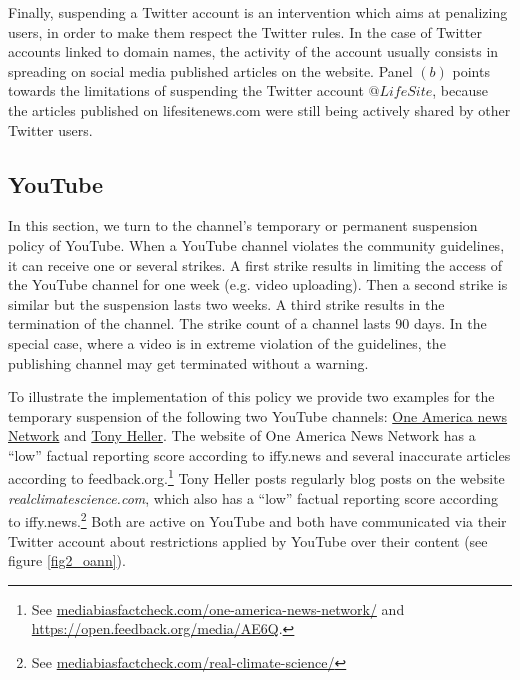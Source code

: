 \documentclass{article}
\begin{document}
Finally, suspending a Twitter account is an intervention which aims at penalizing users, in order to make them respect the Twitter rules. In the case of Twitter accounts linked to domain names, the activity of the account usually consists in spreading on social media published articles on the website. Panel $(b)$ points towards the limitations of suspending the Twitter account $@LifeSite$, because the 
articles published on lifesitenews.com were still being actively shared by other Twitter users.

\subsection{YouTube}

In this section, we turn to the channel's temporary or permanent suspension policy of YouTube. When a YouTube channel violates the community guidelines, it can receive one or several strikes.
A first strike results in limiting the access of the YouTube channel  for one week
(e.g. video uploading). 
Then a second strike is similar but the suspension lasts two weeks. 
A third strike results in the termination of the channel. The strike count of a channel lasts 90 days.  In the special case, where a video is in extreme violation of the guidelines, the publishing channel may get terminated without a warning. 

\smallskip

To illustrate the implementation of this policy we provide two examples for the temporary suspension of the following two YouTube channels: \href{https://www.youtube.com/channel/UCNbIDJNNgaRrXOD7VllIMRQ}{One America news Network} and \href{https://www.youtube.com/user/TonyHeller1}{Tony Heller}. The website of One America News Network has a ``low'' factual reporting score according to iffy.news and several inaccurate articles according to feedback.org.\footnote{See \href{https://mediabiasfactcheck.com/one-america-news-network/}{mediabiasfactcheck.com/one-america-news-network/} and \href{https://open.feedback.org/media/AE6Q}{https://open.feedback.org/media/AE6Q}.}  Tony Heller posts regularly blog posts on the website {\it realclimatescience.com}, which also has a ``low'' factual reporting score according to iffy.news.\footnote{See \href{https://mediabiasfactcheck.com/real-climate-science/}{mediabiasfactcheck.com/real-climate-science/}} Both are active on YouTube and both have communicated via their Twitter account about restrictions applied by YouTube over their content (see figure \ref{fig2_oann}).
\end{document}
